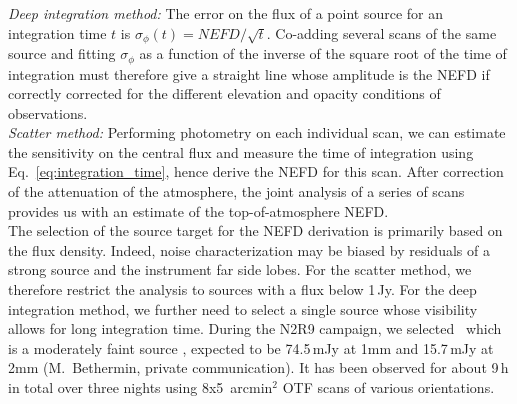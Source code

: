 \noindent \emph{Deep integration method:} The error on the flux of a point source for an
integration time $t$ is $\sigma_\phi(t) = NEFD/\sqrt{t}$. Co-adding several scans of
the same source and fitting $\sigma_\phi$ as a function of the
inverse of the square root of the
time of integration must therefore give a straight line whose
amplitude is the NEFD if correctly corrected for the different
elevation and opacity conditions of observations.\\

\noindent \emph{Scatter method:} Performing photometry on each
individual scan, we can estimate the sensitivity on the central flux
and measure the time of integration using
Eq.~\ref{eq:integration_time}, hence derive the NEFD for this
scan. After correction of the attenuation of the atmosphere, the joint
analysis of a series of scans provides us with an estimate of the
top-of-atmosphere NEFD. \\

The selection of the source target for the NEFD derivation is
primarily based on the flux density. Indeed, noise
characterization may be biased by residuals of a strong source and the
instrument far side lobes. For the scatter method, we therefore
restrict the analysis to sources with a flux below 1\,Jy. For the deep
integration method, we further need to select a single source whose
visibility allows for long integration time. During the N2R9 campaign,
we selected \hls\, which is a
moderately faint source \citep{hls_combes}, expected to be
74.5\,mJy at 1mm and 15.7\,mJy at 2mm (M.~Bethermin, private
communication). It has been observed for about 9\,h in total over
three nights using 8x5~arcmin$^2$ OTF scans of various orientations. 

